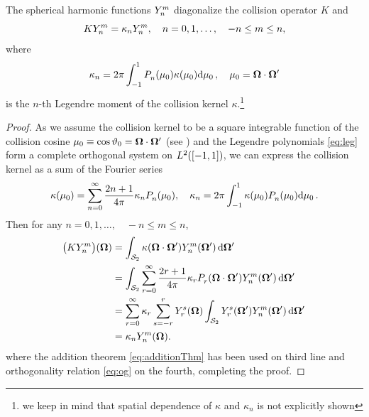 \begin{lemma}\label{lem:appC}
The spherical harmonic functions $\Y{n}{m}$ diagonalize the collision operator $K$ and
$$
	K\Y{n}{m} = \kappa_n \Y{n}{m},\quad n = 0,1,\ldots,\quad -n \leq m \leq n,
$$
where
$$
	\kappa_n = 2\pi \muint[_0]{\P{n}{}(\mu_0)\kappa(\mu_0)},\quad \mu_0 = \bomega\cdot\bomega'
$$
is the $n$-th Legendre moment of the collision kernel $\kappa$.\footnote{we keep in mind that
spatial dependence of $\kappa$ and $\kappa_n$ is not explicitly shown}
\end{lemma}  
\begin{proof}
	As we assume the collision kernel to be a square integrable function of the collision cosine  
	$\mu_0 \equiv \cos \polar_0 = \bomega\cdot\bomega'$ (see )
	and the Legendre polynomials \eqref{eq:leg} form a complete orthogonal system on $\Lp[2]([-1,1])$, we can express the
	collision kernel as a sum of the Fourier series
	$$
		\kappa(\mu_0) = \suma[n]{0}{\infty}\frac{2n+1}{4\pi}\kappa_n\P{n}{}(\mu_0),\quad
		\kappa_n = 2\pi \muint[_0]{\kappa(\mu_0)\P{n}{}(\mu_0)}.
	$$
	Then for any $n = 0,1,\ldots,\quad -n \leq m \leq n$,
	$$
\begin{aligned}
	\bigl(K\Y{n}{m}\bigr)(\bomega) &= \intA[']{\kappa(\bomega\cdot\bomega')\Y{n}{m}(\bomega')} \\
	&= \intA[']{\suma[r]{0}{\infty}\frac{2r+1}{4\pi}\kappa_r\P{r}{}(\bomega\cdot\bomega')\Y{n}{m}(\bomega')} \\
	&= \suma[r]{0}{\infty}\kappa_r\suma[s]{-r}{r}\Y{r}{s}(\bomega)\intA[']{\Y{r}{s}(\bomega')\Y{n}{m}(\bomega')} \\
	&= \kappa_n\Y{n}{m}(\bomega).
\end{aligned}
	$$
	where the addition theorem \eqref{eq:additionThm} has been used on third line and orthogonality relation \eqref{eq:og}
	on the fourth, completing the proof.
\end{proof}

